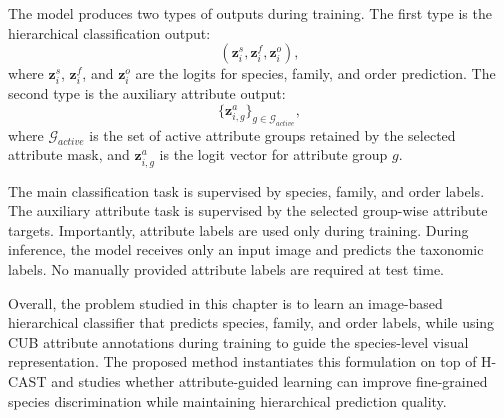 The model produces two types of outputs during training. The first type is the hierarchical classification output:
\begin{equation}
    (\mathbf{z}_i^{s}, \mathbf{z}_i^{f}, \mathbf{z}_i^{o}),
\end{equation}
where \(\mathbf{z}_i^{s}\), \(\mathbf{z}_i^{f}\), and \(\mathbf{z}_i^{o}\) are the logits for species, family, and order prediction. The second type is the auxiliary attribute output:
\begin{equation}
    \{\mathbf{z}_{i,g}^{a}\}_{g \in \mathcal{G}_{active}},
\end{equation}
where \(\mathcal{G}_{active}\) is the set of active attribute groups retained by the selected attribute mask, and \(\mathbf{z}_{i,g}^{a}\) is the logit vector for attribute group \(g\).

The main classification task is supervised by species, family, and order labels. The auxiliary attribute task is supervised by the selected group-wise attribute targets. Importantly, attribute labels are used only during training. During inference, the model receives only an input image and predicts the taxonomic labels. No manually provided attribute labels are required at test time.

Overall, the problem studied in this chapter is to learn an image-based hierarchical classifier that predicts species, family, and order labels, while using CUB attribute annotations during training to guide the species-level visual representation. The proposed method instantiates this formulation on top of H-CAST and studies whether attribute-guided learning can improve fine-grained species discrimination while maintaining hierarchical prediction quality.